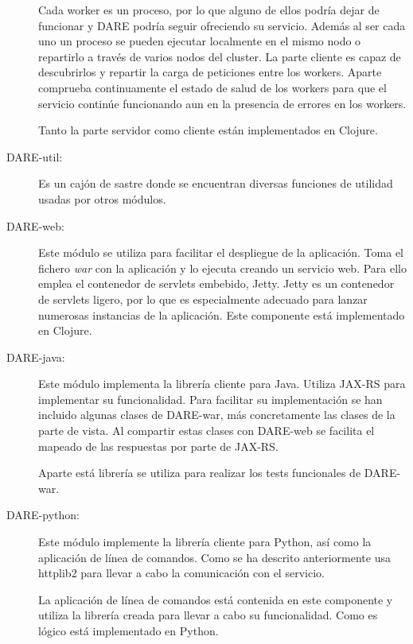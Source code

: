 \begin{description}
  Cada worker es un proceso, por lo que alguno de ellos podría dejar
  de funcionar y DARE podría seguir ofreciendo su servicio. Además al
  ser cada uno un proceso se pueden ejecutar localmente en el mismo
  nodo o repartirlo a través de varios nodos del cluster. La parte
  cliente es capaz de descubrirlos y repartir la carga de peticiones
  entre los workers. Aparte comprueba continuamente el estado de salud
  de los workers para que el servicio continúe funcionando aun en la
  presencia de errores en los workers.

 Tanto la parte servidor como cliente están implementados en Clojure.

\item[DARE-util:] Es un cajón de sastre donde se encuentran diversas
  funciones de utilidad usadas por otros módulos.

\item[DARE-web:] Este módulo se utiliza para facilitar el despliegue
  de la aplicación. Toma el fichero \emph{war} con la aplicación y lo
  ejecuta creando un servicio web. Para ello emplea el contenedor de
  servlets embebido, Jetty\cite{JETTY}. Jetty es un contenedor de
  servlets ligero, por lo que es especialmente adecuado para lanzar
  numerosas instancias de la aplicación. Este componente está
  implementado en Clojure.

\item[DARE-java:] Este módulo implementa la librería cliente para
  Java. Utiliza JAX-RS para implementar su funcionalidad. Para
  facilitar su implementación se han incluido algunas clases de
  DARE-war, más concretamente las clases de la parte de vista. Al
  compartir estas clases con DARE-web se facilita el mapeado de las
  respuestas por parte de JAX-RS.

  Aparte está librería se utiliza para realizar los tests funcionales
  de DARE-war.
\item[DARE-python:] Este módulo implemente la librería cliente para
  Python, así como la aplicación de línea de comandos. Como se ha
  descrito anteriormente usa httplib2 para llevar a cabo la
  comunicación con el servicio.

  La aplicación de línea de comandos está contenida en este componente
  y utiliza la librería creada para llevar a cabo su
  funcionalidad. Como es lógico está implementado en Python.
\end{description}


